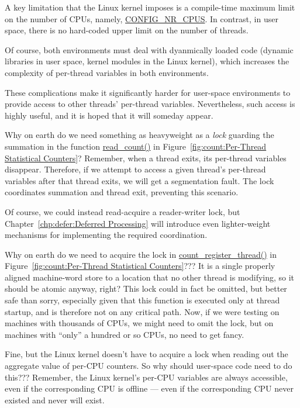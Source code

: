 	A key limitation that the Linux kernel imposes is a compile-time
	maximum limit on the number of CPUs, namely,
	\url{CONFIG_NR_CPUS}.
	In contrast, in user space, there is no hard-coded upper limit
	on the number of threads.

	Of course, both environments must deal with dyanmically loaded
	code (dynamic libraries in user space, kernel modules in the
	Linux kernel), which increases the complexity of per-thread
	variables in both environments.

	These complications make it significantly harder for user-space
	environments to provide access to other threads' per-thread
	variables.
	Nevertheless, such access is highly useful, and it is hoped
	that it will someday appear.

\QuickQ{}
	Why on earth do we need something as heavyweight as a \emph{lock}
	guarding the summation in the function \url{read_count()} in
	Figure~\ref{fig:count:Per-Thread Statistical Counters}?
\QuickA{}
	Remember, when a thread exits, its per-thread variables disappear.
	Therefore, if we attempt to access a given thread's per-thread
	variables after that thread exits, we will get a segmentation
	fault.
	The lock coordinates summation and thread exit, preventing this
	scenario.

	Of course, we could instead read-acquire a reader-writer lock,
	but Chapter~\ref{chp:defer:Deferred Processing} will introduce even
	lighter-weight mechanisms for implementing the required coordination.

\QuickQ{}
	Why on earth do we need to acquire the lock in
	\url{count_register_thread()} in
	Figure~\ref{fig:count:Per-Thread Statistical Counters}???
	It is a single properly aligned machine-word store to a location
	that no other thread is modifying, so it should be atomic anyway,
	right?
\QuickA{}
	This lock could in fact be omitted, but better safe than
	sorry, especially given that this function is executed only at
	thread startup, and is therefore not on any critical path.
	Now, if we were testing on machines with thousands of CPUs,
	we might need to omit the lock, but on machines with ``only''
	a hundred or so CPUs, no need to get fancy.

\QuickQ{}
	Fine, but the Linux kernel doesn't have to acquire a lock
	when reading out the aggregate value of per-CPU counters.
	So why should user-space code need to do this???
\QuickA{}
	Remember, the Linux kernel's per-CPU variables are always
	accessible, even if the corresponding CPU is offline --- even
	if the corresponding CPU never existed and never will exist.

